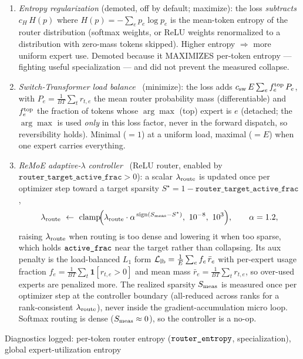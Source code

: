 \documentclass[11pt]{article}
\newcommand{\code}[1]{\texttt{#1}}
\begin{document}
\begin{enumerate}
\item \emph{Entropy regularization} (demoted, off by default; maximize): the loss \emph{subtracts}
  \(c_H\,H(p)\) where \(H(p)=-\sum_e p_e\log p_e\) is the mean-token entropy of the router
  distribution (softmax weights, or ReLU weights renormalized to a distribution with zero-mass tokens
  skipped).  Higher entropy \(\Rightarrow\) more uniform expert use.  Demoted because it MAXIMIZES
  per-token entropy --- fighting useful specialization --- and did not prevent the measured collapse.
\item \emph{Switch-Transformer load balance}~\cite{switch} (minimize): the loss adds
  \(c_{\rm sw}\,E\sum_e f^{\rm top}_e\,P_e\), with \(P_e=\frac{1}{BT}\sum_t r_{t,e}\) the mean router
  probability mass (differentiable) and \(f^{\rm top}_e\) the fraction of tokens whose \(\arg\max\)
  (top) expert is \(e\) (detached; the \(\arg\max\) is used \emph{only} in this loss factor, never in
  the forward dispatch, so reversibility holds).  Minimal (\(=1\)) at a uniform load, maximal (\(=E\))
  when one expert carries everything.
\item \emph{ReMoE adaptive-\(\lambda\) controller}~\cite{remoe} (ReLU router, enabled by
  \(\texttt{router\_target\_active\_frac}>0\)): a scalar \(\lambda_{\rm route}\) is updated once per
  optimizer step toward a target sparsity \(S^\star=1-\texttt{router\_target\_active\_frac}\),
\[
  \lambda_{\rm route}\ \leftarrow\ \mathrm{clamp}\!\Big(\lambda_{\rm route}\cdot\alpha^{\,\mathrm{sign}(S_{\rm meas}-S^\star)},\ 10^{-8},\ 10^{3}\Big),\qquad \alpha=1.2,
\]
  raising \(\lambda_{\rm route}\) when routing is too dense and lowering it when too sparse, which
  holds \(\code{\detokenize{active_frac}}\) near the target rather than collapsing.  Its aux penalty is the
  load-balanced \(L_1\) form \(\mathcal{L}_{\rm lb}=\frac{1}{E}\sum_e f_e\,\bar r_e\) with per-expert usage
  fraction \(f_e=\frac{1}{BT}\sum_{t}\mathbf{1}[r_{t,e}>0]\) and mean mass \(\bar r_e=\frac{1}{BT}\sum_t r_{t,e}\),
  so over-used experts are penalized more.  The realized sparsity
  \(S_{\rm meas}\) is measured once per optimizer step at the controller boundary (all-reduced
  across ranks for a rank-consistent \(\lambda_{\rm route}\)), never inside the gradient-accumulation
  micro loop.  Softmax routing is dense (\(S_{\rm meas}\approx0\)), so the controller is a no-op.
\end{enumerate}
Diagnostics logged: per-token router entropy
(\(\code{\detokenize{router_entropy}}\), specialization), global expert-utilization entropy
\end{document}
